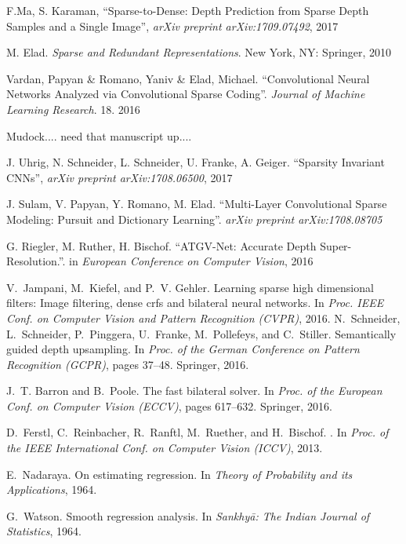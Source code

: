 \begin{thebibliography}{99}
  F.Ma, S. Karaman, ``Sparse-to-Dense: Depth Prediction from Sparse Depth Samples and a Single Image'', \emph{arXiv preprint arXiv:1709.07492}, 2017
  
  M. Elad. \emph{Sparse and Redundant Representations}. New York, NY: Springer, 2010

  Vardan, Papyan \& Romano, Yaniv \& Elad, Michael. ``Convolutional Neural Networks Analyzed via Convolutional Sparse Coding''. \emph{Journal of Machine Learning Research}. 18. 2016

  Mudock.... need that manuscript up....

  J. Uhrig, N. Schneider, L. Schneider, U. Franke, A. Geiger. ``Sparsity Invariant CNNs'', \emph{arXiv preprint arXiv:1708.06500}, 2017

  J. Sulam, V. Papyan, Y. Romano, M. Elad. ``Multi-Layer Convolutional Sparse Modeling: Pursuit and Dictionary Learning''. \emph{arXiv preprint arXiv:1708.08705}

  G. Riegler, M. Ruther, H. Bischof. ``ATGV-Net: Accurate Depth Super-Resolution.''. in \emph{European Conference on Computer Vision}, 2016

  V.~Jampani, M.~Kiefel, and P.~V. Gehler.
  \newblock Learning sparse high dimensional filters: Image filtering, dense crfs
  and bilateral neural networks.
  \newblock In {\em Proc. IEEE Conf. on Computer Vision and Pattern Recognition
    (CVPR)}, 2016.
  N.~Schneider, L.~Schneider, P.~Pinggera, U.~Franke, M.~Pollefeys, and
  C.~Stiller.
  \newblock Semantically guided depth upsampling.
  \newblock In {\em Proc. of the German Conference on Pattern Recognition
    (GCPR)}, pages 37--48. Springer, 2016.

J.~T. Barron and B.~Poole.
\newblock The fast bilateral solver.
\newblock In {\em Proc. of the European Conf. on Computer Vision (ECCV)}, pages
  617--632. Springer, 2016.

D.~Ferstl, C.~Reinbacher, R.~Ranftl, M.~Ruether, and H.~Bischof.
.
\newblock In {\em Proc. of the IEEE International Conf. on Computer Vision
  (ICCV)}, 2013.

E.~Nadaraya.
\newblock On estimating regression.
\newblock In {\em Theory of Probability and its Applications}, 1964.

G.~Watson.
\newblock Smooth regression analysis.
\newblock In {\em Sankhyā: The Indian Journal of Statistics}, 1964.

\end{thebibliography}